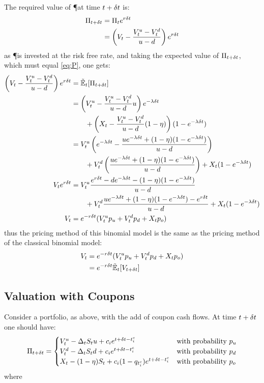 \documentclass[a4paper,11pt,oneside]{report}
\theoremstyle{plain}
\theoremstyle{definition}
\begin{document}
The required value of \P at time $t + \delta t$ is:
\begin{align}
 \Pi_{t + \delta t}  &= \Pi_t e^{r\delta t} \nonumber\\
       &= \left(V_t - \frac{V^{u}_t - V^{d}_t}{u - d}\right) e^{r\delta t} \label{eq:P}
\end{align}
as \P is invested at the risk free rate, and taking the expected value of $\Pi_{t + \delta t}$, which must equal \eqref{eq:P}, one gets:
\begin{align}
 \left(\V - \frac{\Vu - \Vd}{u - d}\right) e^{r\Dt} &= \Et[\PDt] \n
        &= \left(\Vu - \frac{\Vu - \Vd}{u - d}u\right) e^{-\lambda\Dt} \n
        &\qquad + \left(\X - \frac{\Vu - \Vd}{u - d}(1 - \eta)\right)(1 - e^{-\lambda\Dt}) \n
        &= \Vu\left(e^{-\lambda\Dt} - \frac{ue^{-\lambda\Dt} + (1 - \eta)(1 - e^{-\lambda\Dt})}{u - d}\right) \n
        &\qquad + \Vd\left(\frac{ue^{-\lambda\Dt} + (1 - \eta)(1 - e^{-\lambda\Dt})}{u - d}\right) + \X(1 - e^{-\lambda\Dt}) \n
 \V e^{r\Dt} &= \Vu\frac{e^{r\Dt} - de^{-\lambda\Dt} - (1 - \eta)(1 - e^{-\lambda\Dt})}{u - d} \n
        &\qquad + \Vd\frac{ue^{-\lambda\Dt} + (1 - \eta)(1 - e^{-\lambda\Dt}) - e^{r\Dt}}{u - d} + \X(1 - e^{-\lambda\Dt}) \n
 \V     &= e^{-r\Dt}(\Vu\pu + \Vd\pd + \X\po)
\end{align}
thus the pricing method of this binomial model is the same as the pricing method of the classical binomial model:
\begin{align}
 V_t    &= e^{-r\Dt}(\Vu\pu + \Vd\pd + \X\po) \n
        &= e^{-r\Dt}\Et[V_{t + \Dt}]
\end{align}


\subsection{Valuation with Coupons}
Consider a portfolio, as above, with the add of coupon cash flows.  At time $t + \delta t$ one should have:
\begin{equation*}
 \Pi_{t + \delta t} =
 \begin{cases}
  V^{u}_t - \Delta_tS_t u + c_i e^{t + \delta t - t^{c}_i}      & \text{with probability } p_u \\
  V^{d}_t - \Delta_tS_t d + c_i e^{t + \delta t - t^{c}_i}      & \text{with probability } p_d\\
  X_t - (1 - \eta)S_t + c_i (1 - q_{t^{c}_i})e^{t + \delta t - t^{c}_i} & \text{with probability } p_o\\
 \end{cases}
\end{equation*}
where
\end{document}
